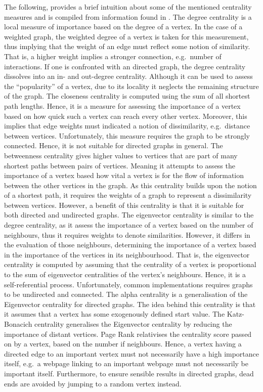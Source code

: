 \documentclass[11pt,a4paper]{book}
\theoremstyle{definition}
\theoremstyle{definition}
\theoremstyle{definition}
\theoremstyle{remark}
\begin{document}
The following, provides a brief intuition about some of the mentioned centrality measures and is compiled from information found in \parencite{segarra2015stability,del2011centrality,bloch2019centrality,bonacich2001eigenvector,page1999pagerank}.
The degree centrality is a local measure of importance based on the degree of a vertex. In the case of a weighted graph, the weighted degree of a vertex is taken for this measurement, thus implying that the weight of an edge must reflect some notion of similarity. That is, a higher weight implies a stronger connection, e.g.\ number of interactions. If one is confronted with an directed graph, the degree centrality dissolves into an in- and out-degree centrality.
Although it can be used to assess the ``popularity'' of a vertex, due to its locality it neglects the remaining structure of the graph. 
The closeness centrality is computed using the sum of all shortest path lengths. Hence, it is a measure for assessing the importance of a vertex based on how quick such a vertex can reach every other vertex. 
Moreover, this implies that edge weights must indicated a notion of dissimilarity, e.g.\ distance between vertices. Unfortunately, this measure requires the graph to be strongly connected. Hence, it is not suitable for directed graphs in general.  
The betweenness centrality gives higher values to vertices that are part of many shortest paths between pairs of vertices. Meaning it attempts to assess the importance of a vertex based how vital a vertex is for the flow of information between the other vertices in the graph. As this centrality builds upon the notion of a shortest path, it requires the weights of a graph to represent a dissimilarity between vertices. However, a benefit of this centrality is that it is suitable for both directed and undirected graphs.
The eigenvector centrality is similar to the degree centrality, as it assess the importance of a vertex based on the number of neighbours, thus it requires weights to denote similarities. However, it differs in the evaluation of those neighbours, determining the importance of a vertex based in the importance of the vertices in its neighbourhood. That is, the eigenvector centrality is computed by assuming that the centrality of a vertex is proportional to the sum of eigenvector centralities of the vertex's neighbours. Hence, it is a self-referential process. Unfortunately, common implementations requires graphs to be undirected and connected. 
The  alpha centrality is a generalisation of the Eigenvector centrality for directed graphs. The idea behind this centrality is that it assumes that a vertex has some exogenously defined start value. The Katz-Bonacich centrality generalises the Eigenvector centrality by reducing the importance of distant vertices. 
Page Rank relativises the centrality score passed on by a vertex, based on the number if neighbours. Hence, a vertex having a directed edge to an important vertex must not necessarily have a high importance itself, e.g.\ a webpage linking to an important webpage must not necessarily be important itself. Furthermore, to ensure sensible results in directed graphs, dead ends are avoided by jumping to a random vertex instead.
\end{document}
